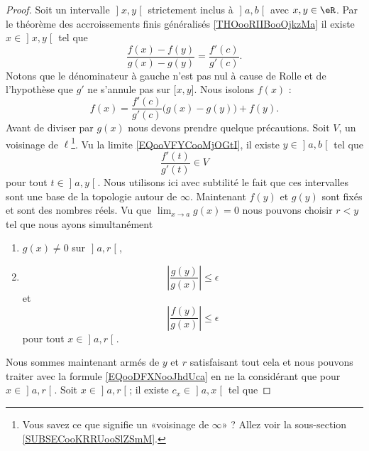 \begin{proof}
Soit un intervalle \( \mathopen] x , y \mathclose[\) strictement inclus à \( \mathopen] a , b \mathclose[\) avec \( x,y\in\eR\). Par le théorème des accroissements finis généralisés \ref{THOooRIIBooOjkzMa} il existe \( x\in \mathopen] x , y \mathclose[\) tel que
    \begin{equation}
        \frac{ f(x)-f(y) }{ g(x)-g(y) }=\frac{ f'(c) }{ g'(c) }.
    \end{equation}
    Notons que le dénominateur à gauche n'est pas nul à cause de Rolle et de l'hypothèse que \( g'\) ne s'annule pas sur \( \mathopen[ x , y \mathclose]\). Nous isolons \( f(x)\) :
    \begin{equation}        \label{EQooDFXNooJhdUca}
        f(x)=\frac{ f'(c) }{ g'(c) }\Big( g(x)-g(y) \Big)+f(y).
    \end{equation}
Avant de diviser par \( g(x)\) nous devons prendre quelque précautions. Soit \( V\), un voisinage de \( \ell\)\footnote{Vous savez ce que signifie un «voisinage de \( \infty\)» ? Allez voir la sous-section \ref{SUBSECooKRRUooSlZSmM}.}. Vu la limite \eqref{EQooVFYCooMjOGtI}, il existe \( y\in \mathopen] a , b \mathclose[\) tel que
    \begin{equation}
        \frac{ f'(t) }{ g'(t) }\in V
    \end{equation}
pour tout \( t\in \mathopen] a , y \mathclose[\). Nous utilisons ici avec subtilité le fait que ces intervalles sont une base de la topologie autour de \( \infty\). Maintenant \( f(y)\) et \( g(y)\) sont fixés et sont des nombres réels. Vu que \( \lim_{x\to a} g(x)=0\) nous pouvons choisir \( r<y\) tel que nous ayons simultanément
    \begin{enumerate}
        \item
        \( g(x)\neq 0\) sur \( \mathopen] a , r \mathclose[\),
        \item
            \begin{equation}
                | \frac{ g(y) }{ g(x) } |\leq \epsilon
            \end{equation}
            et
            \begin{equation}
                | \frac{ f(y) }{ g(x) } |\leq \epsilon
            \end{equation}
        pour tout \( x\in \mathopen] a , r \mathclose[\).
    \end{enumerate}
Nous sommes maintenant armés de \( y\) et \( r\) satisfaisant tout cela et nous pouvons traiter avec la formule \eqref{EQooDFXNooJhdUca} en ne la considérant que pour \( x\in \mathopen] a , r \mathclose[\). Soit \( x\in \mathopen] a , r \mathclose[\); il existe \( c_x\in \mathopen] a , x \mathclose[\) tel que

\end{proof}
